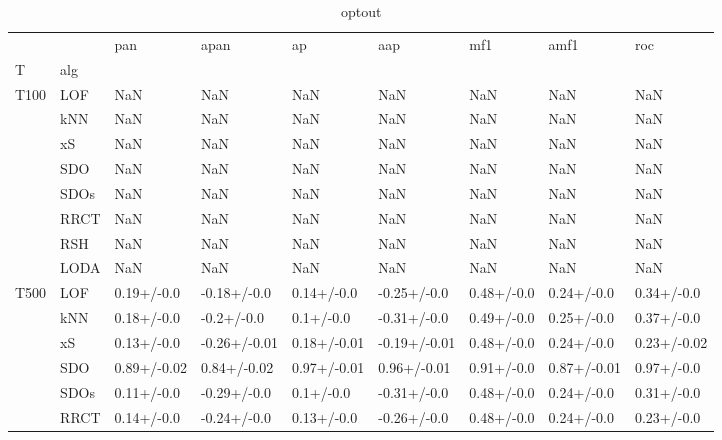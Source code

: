 \begin{table}
\centering
\caption{optout}
\begin{tabular}{lllllllll}
\toprule
      &      &          pan &          apan &           ap &           aap &          mf1 &         amf1 &          roc \\
T & alg &              &               &              &               &              &              &              \\
\midrule
T100 & LOF &          NaN &           NaN &          NaN &           NaN &          NaN &          NaN &          NaN \\
      & kNN &          NaN &           NaN &          NaN &           NaN &          NaN &          NaN &          NaN \\
      & xS &          NaN &           NaN &          NaN &           NaN &          NaN &          NaN &          NaN \\
      & SDO &          NaN &           NaN &          NaN &           NaN &          NaN &          NaN &          NaN \\
      & SDOs &          NaN &           NaN &          NaN &           NaN &          NaN &          NaN &          NaN \\
      & RRCT &          NaN &           NaN &          NaN &           NaN &          NaN &          NaN &          NaN \\
      & RSH &          NaN &           NaN &          NaN &           NaN &          NaN &          NaN &          NaN \\
      & LODA &          NaN &           NaN &          NaN &           NaN &          NaN &          NaN &          NaN \\
T500 & LOF &   0.19+/-0.0 &   -0.18+/-0.0 &   0.14+/-0.0 &   -0.25+/-0.0 &   0.48+/-0.0 &   0.24+/-0.0 &   0.34+/-0.0 \\
      & kNN &   0.18+/-0.0 &    -0.2+/-0.0 &    0.1+/-0.0 &   -0.31+/-0.0 &   0.49+/-0.0 &   0.25+/-0.0 &   0.37+/-0.0 \\
      & xS &   0.13+/-0.0 &  -0.26+/-0.01 &  0.18+/-0.01 &  -0.19+/-0.01 &   0.48+/-0.0 &   0.24+/-0.0 &  0.23+/-0.02 \\
      & SDO &  0.89+/-0.02 &   0.84+/-0.02 &  0.97+/-0.01 &   0.96+/-0.01 &   0.91+/-0.0 &  0.87+/-0.01 &   0.97+/-0.0 \\
      & SDOs &   0.11+/-0.0 &   -0.29+/-0.0 &    0.1+/-0.0 &   -0.31+/-0.0 &   0.48+/-0.0 &   0.24+/-0.0 &   0.31+/-0.0 \\
      & RRCT &   0.14+/-0.0 &   -0.24+/-0.0 &   0.13+/-0.0 &   -0.26+/-0.0 &   0.48+/-0.0 &   0.24+/-0.0 &   0.23+/-0.0 \\

\end{tabular}
\end{table}
